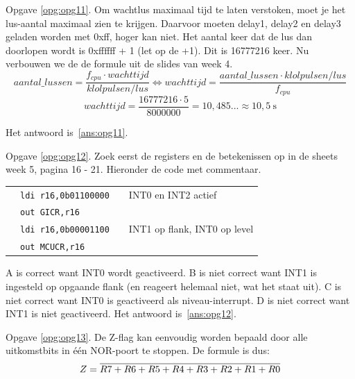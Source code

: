 \documentclass[a4paper,12pt,fleqn,dutch]{tisdexam}
\let\mathup\mathrm
\newcommand*{\oline}[1]{\overline{#1\mathstrut}}
\begin{document}
\begin{questions}
\vspace{1em}
Opgave \ref{opg:opg11}. Om wachtlus maximaal tijd te laten verstoken, moet je het
lus-aantal maximaal zien te krijgen. Daarvoor moeten delay1, delay2 en delay3
geladen worden met 0x{f}{f}, hoger kan niet. Het aantal keer dat de lus dan
doorlopen wordt is 0x{f}{f}{f}{f}{f}{f} + 1 (let op de +1). Dit is 16777216 keer. Nu
verbouwen we de de formule uit de slides van week 4.
\begin{equation}
\nonumber aantal\_lussen = \dfrac{f_{cpu} \cdot wachttijd}{klolpulsen/lus} 
                           \Longleftrightarrow wachttijd = 
                           \dfrac{aantal\_lussen \cdot klolpulsen/lus}{f_{cpu}}
\end{equation} 
\begin{equation}
\nonumber wachttijd = \dfrac{16777216 \cdot 5}{8000000} = 10,485... 
                      \approx 10,5 \: \mathup{s}
\end{equation} 

Het antwoord is~\ref{ans:opg11}.

\vspace{1em}
Opgave \ref{opg:opg12}. Zoek eerst de registers en de betekenissen op in de sheets
week 5, pagina 16 - 21. Hieronder de code met commentaar.

\begin{table}[h!]
	\begin{tabular}{l l l l}
		 & \texttt{ldi r16,0b01100000}   &  &  INT0 en INT2 actief  \\ 
	 	 & \texttt{out GICR,r16}         &  &    \\ 
		 & \texttt{ldi r16,0b00001100}   &  &  INT1 op flank, INT0 op level \\ 
	 	 & \texttt{out MCUCR,r16}        &  &    \\ 
	\end{tabular} 
\end{table}

A is correct want INT0 wordt geactiveerd. B is niet correct want INT1 is
ingesteld op opgaande flank (en reageert helemaal niet, wat het staat uit).
C is niet correct want INT0 is geactiveerd als niveau-interrupt. D is niet
correct want INT1 is niet geactiveerd. Het antwoord is~\ref{ans:opg12}.

\vspace{1em}
Opgave \ref{opg:opg13}. De Z-flag kan eenvoudig worden bepaald door alle uitkomstbits
in \'{e}\'{e}n NOR-poort te stoppen. De formule is dus:
\begin{equation}
\nonumber Z = \oline{R7+R6+R5+R4+R3+R2+R1+R0}
\end{equation} 


\end{questions}
\end{document}
